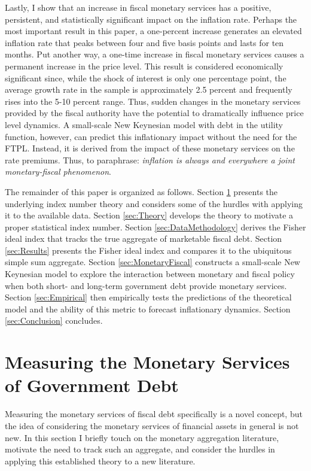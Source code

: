 \documentclass[11pt,a4paper,margin=1.5in]{article}
\begin{document}
Lastly, I show that an increase in fiscal monetary services has a positive, persistent, and statistically significant impact on the inflation rate.
Perhaps the most important result in this paper, a one-percent increase generates an elevated inflation rate that peaks between four and five basis points and lasts for ten months. 
Put another way, a one-time increase in fiscal monetary services causes a permanent increase in the price level. 
This result is considered economically significant since, while the shock of interest is only one percentage point, the average growth rate in the sample is approximately 2.5 percent and frequently rises into the 5-10 percent range.
Thus, sudden changes in the monetary services provided by the fiscal authority have the potential to dramatically influence price level dynamics.
A small-scale New Keynesian model with debt in the utility function, however, can predict this inflationary impact without the need for the FTPL. 
Instead, it is derived from the impact of these monetary services on the rate premiums. 
Thus, to paraphrase: {\em inflation is always and everywhere a joint monetary-fiscal phenomenon}.


The remainder of this paper is organized as follows.
Section \ref{sec:MonAgg} presents the underlying index number theory and considers some of the hurdles with applying it to the available data.
Section \ref{sec:Theory} develops the theory to motivate a proper statistical index number.
Section \ref{sec:DataMethodology} derives the Fisher ideal index that tracks the true aggregate of marketable fiscal debt.
Section \ref{sec:Results} presents the Fisher ideal index and compares it to the ubiquitous simple sum aggregate.
Section \ref{sec:MonetaryFiscal} constructs a small-scale New Keynesian model to explore the interaction between monetary and fiscal policy when both short- and long-term government debt provide monetary services.
Section \ref{sec:Empirical} then empirically tests the predictions of the theoretical model and the ability of this metric to forecast inflationary dynamics.
Section \ref{sec:Conclusion} concludes.


\section{Measuring the Monetary Services of Government Debt}
\label{sec:MonAgg}
Measuring the monetary services of fiscal debt specifically is a novel concept, but the idea of considering the monetary services of financial assets in general is not new.
In this section I briefly touch on the monetary aggregation literature, motivate the need to track such an aggregate, and consider the hurdles in applying this established theory to a new literature. 
\end{document}
